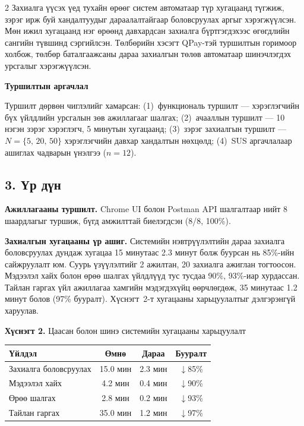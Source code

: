 \begin{multicols}{2}
Захиалга үүсэх үед тухайн өрөөг систем автоматаар түр хугацаанд түгжиж, зэрэг ирж буй хандалтуудыг дараалалтайгаар боловсруулах аргыг хэрэгжүүлсэн. Мөн ижил хугацаанд нэг өрөөнд давхардсан захиалга бүртгэгдэхээс өгөгдлийн сангийн түвшинд сэргийлсэн. Төлбөрийн хэсэгт QPay-тэй туршилтын горимоор холбож, төлбөр баталгаажсаны дараа захиалгын төлөв автоматаар шинэчлэгдэх урсгалыг хэрэгжүүлсэн.

\textbf{Туршилтын аргачлал}

Туршилт дөрвөн чиглэлийг хамарсан: (1)~функциональ туршилт --- хэрэглэгчийн бүх үйлдлийн урсгалын зөв ажиллагааг шалгах; (2)~ачааллын туршилт --- 10 нэгэн зэрэг хэрэглэгч, 5 минутын хугацаанд; (3)~зэрэг захиалгын туршилт --- $N=\{5,\,20,\,50\}$ хэрэглэгчийн давхар хандалтын нөхцөлд; (4)~SUS аргачлалаар ашиглах чадварын үнэлгээ ($n=12$).

\subsection*{3. Үр дүн}

\textbf{Ажиллагааны туршилт.} Chrome UI болон Postman API шалгалтаар нийт 8 шаардлагыг туршиж, бүгд амжилттай биелэгдсэн (8/8, 100\%).

\textbf{Захиалгын хугацааны үр ашиг.} Системийн нэвтрүүлэлтийн дараа захиалга боловсруулах дундаж хугацаа 15 минутаас 2.3 минут болж буурсан нь 85\%-ийн сайжруулалт юм. Суурь үзүүлэлтийг 2 ажилтан, 20 захиалга ажиглан тогтоосон. Мэдээлэл хайх болон өрөө шалгах үйлдлүүд тус тусдаа 90\%, 93\%-иар хурдассан. Тайлан гаргах үйл ажиллагаа хамгийн мэдэгдэхүйц өөрчлөгдөж, 35 минутаас 1.2 минут болов (97\% бууралт). Хүснэгт~2-т хугацааны харьцуулалтыг дэлгэрэнгүй харуулав.

\begin{center}
\footnotesize
\textbf{Хүснэгт 2.} Цаасан болон шинэ системийн хугацааны харьцуулалт\\[3pt]
\begin{tabular}{|l|c|c|c|}
  \hline
  \textbf{Үйлдэл} & \textbf{Өмнө} & \textbf{Дараа} & \textbf{Бууралт} \\
  \hline
  Захиалга боловсруулах & 15.0 мин & 2.3 мин & $\downarrow$85\% \\
  Мэдээлэл хайх         & 4.2 мин  & 0.4 мин & $\downarrow$90\% \\
  Өрөө шалгах           & 2.8 мин  & 0.2 мин & $\downarrow$93\% \\
  Тайлан гаргах          & 35.0 мин & 1.2 мин & $\downarrow$97\% \\
  \hline
\end{tabular}
\end{center}


\end{multicols}
